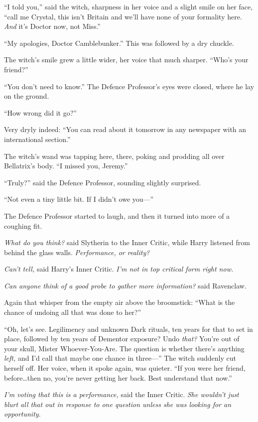 “I told you,” said the witch, sharpness in her voice and a slight smile on her
face, “call me Crystal, this isn’t Britain and we’ll have none of your
formality here. \emph{And} it’s Doctor now, not Miss.”

“My apologies, Doctor Camblebunker.” This was followed by a dry chuckle.

The witch’s smile grew a little wider, her voice that much sharper. “Who’s your
friend?”

“You don’t need to know.” The Defence Professor’s eyes were closed, where he
lay on the ground.

“How wrong did it go?”

Very dryly indeed: “You can read about it tomorrow in any newspaper with an
international section.”

The witch’s wand was tapping here, there, poking and prodding all over
Bellatrix’s body. “I missed you, Jeremy.”

“Truly?” said the Defence Professor, sounding slightly surprised.

“Not even a tiny little bit. If I didn’t owe you—”

The Defence Professor started to laugh, and then it turned into more of a
coughing fit.

\emph{What do you think?} said Slytherin to the Inner Critic, while Harry
listened from behind the glass walls. \emph{Performance, or reality?}

\emph{Can’t tell,} said Harry’s Inner Critic. \emph{I’m not in top critical
form right now.}

\emph{Can anyone think of a good probe to gather more information?} said
Ravenclaw.

Again that whisper from the empty air above the broomstick: “What is the chance
of undoing all that was done to her?”

“Oh, let’s see. Legilimency and unknown Dark rituals, ten years for that to set
in place, followed by ten years of Dementor exposure? Undo \emph{that?} You’re
out of your skull, Mister Whoever-You-Are. The question is whether there’s
anything \emph{left,} and I’d call that maybe one chance in three—” The witch
suddenly cut herself off. Her voice, when it spoke again, was quieter. “If you
were her friend, before…then no, you’re never getting her back. Best
understand that now.”

\emph{I’m voting that this is a performance,} said the Inner Critic. \emph{She
wouldn’t just blurt all that out in response to one question unless she was
looking for an opportunity.}


